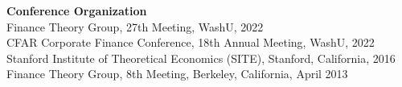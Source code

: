 \documentclass[margin,line,11pt]{resume}
\begin{document}
\begin{resume}
  {\bf Conference Organization} \\
  Finance Theory Group, 27th Meeting, WashU, 2022 \\
  CFAR Corporate Finance Conference, 18th Annual Meeting, WashU, 2022 \\
  Stanford Institute of Theoretical Economics (SITE), Stanford, California, 2016 \\
 Finance Theory Group, 8th Meeting, Berkeley, California, April 2013 





%
%
%
%
%
%

\end{resume}
\end{document}
